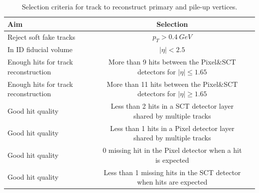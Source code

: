 \begin{table}[tbh]
\centering
\scriptsize
\begin{tabular}{|l|c|c}

\hline
 Aim& Selection \\
\hline
Reject soft fake tracks &$p_T> 0.4~GeV$ \\
\hline
In ID fiducial volume &$|\eta| < 2.5$ \\
\hline 
    Enough hits for track reconstruction & More than 9 hits between the Pixel\&SCT detectors for $|\eta|\le 1.65$\\
\hline 
    Enough hits for track reconstruction & More than 11 hits between the Pixel\&SCT detectors for $|\eta|\ge 1.65$\\
    
\hline 
 Good hit quality& Less than 2 hits in a SCT detector layer shared by multiple tracks\\
\hline 
 Good hit quality& Less than 1 hits in a Pixel detector layer shared by multiple tracks\\
\hline
 Good hit quality&0 missing hit in the Pixel detector when a hit is expected\\
\hline 
Good hit quality&Less than 1 missing hits in the SCT detector when hits are expected\\
 \hline
\end{tabular}
\caption{Selection criteria for track to reconstruct primary and pile-up vertices.}
\label{tab:pv}

\end{table}


